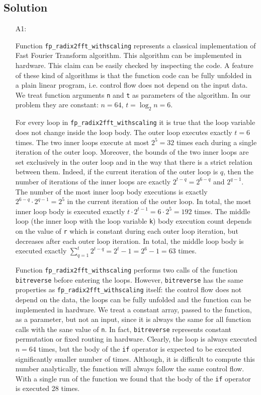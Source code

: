 \documentclass[12pt,a4paper,titlepage,oneside]{article}
\begin{document}
\subsection{Solution}
\begin{itemize}
\item[A1:] 

Function \texttt{fp\_radix2fft\_withscaling} represents a classical implementation of Fast Fourier Transform algorithm.
This algorithm can be implemented in hardware.
This claim can be easily checked by inspecting the code.
A feature of these kind of algorithms is that the function code can be fully unfolded in a plain linear program, i.e. control flow does not depend on the input data.
We treat function arguments \texttt{n} and \texttt{t} as parameters of the algorithm.
In our problem they are constant: $n=64$, $t=\log_2 n = 6$.

For every loop in \texttt{fp\_radix2fft\_withscaling} it is true that the loop variable does not change inside the loop body.
The outer loop executes exactly $t=6$ times.
The two inner loops execute at most $2^5=32$ times each during a single iteration of the outer loop.
Moreover, the bounds of the two inner loops are set exclusively in the outer loop and in the way that there is a strict relation between them.
Indeed, if the current iteration of the outer loop is $q$, then the number of iterations of the inner loops are exactly $2^{t-q}=2^{6-q}$ and $2^{q-1}$.
The number of the most inner loop body executions is exactly $2^{6-q}\cdot2^{q-1}=2^5$ in the current iteration of the outer loop.
In total, the most inner loop body is executed exactly $t\cdot2^{t-1}=6\cdot2^5=192$ times.
The middle loop (the inner loop with the loop variable \texttt{k}) body execution count depends on the value of \texttt{r} which is constant during each outer loop iteration, but decreases after each outer loop iteration.
In total, the middle loop body is executed exactly $\sum_{q=1}^t 2^{t-q} = 2^t -1 = 2^6-1 = 63$ times.

Function \texttt{fp\_radix2fft\_withscaling} performs two calls of the function \texttt{bitreverse} before entering the loops.
However, \texttt{bitreverse} has the same properties as \texttt{fp\_radix2fft\_withscaling} itself: the control flow does not depend on the data, the loops can be fully unfolded and the function can be implemented in hardware.
We treat a constant array, passed to the function, as a parameter, but not an input, since it is always the same for all function calls with the sane value of \texttt{n}.
In fact, \texttt{bitreverse} represents constant permutation or fixed routing in hardware.
Clearly, the loop is always executed $n=64$ times, but the body of the \texttt{if} operator is expected to be executed significantly smaller number of times.
Although, it is difficult to compute this number analytically, the function will always follow the same control flow.
With a single run of the function we found that the body of the \texttt{if} operator is executed 28 times.


\end{itemize}
\end{document}
